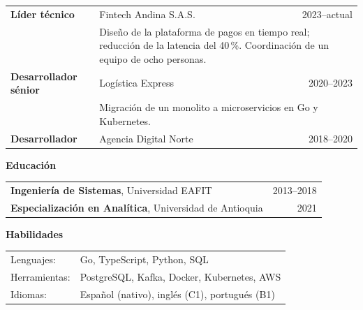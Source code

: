 \documentclass[10pt,letterpaper]{article}
\begin{document}
\begin{tabularx}{\textwidth}{@{}l X r@{}}
\textbf{Líder técnico} & Fintech Andina S.A.S. & 2023--actual\\
& \multicolumn{2}{p{0.75\textwidth}}{Diseño de la plataforma de pagos en tiempo real;
reducción de la latencia del 40\,\%. Coordinación de un equipo de ocho personas.}\\[6pt]
\textbf{Desarrollador sénior} & Logística Express & 2020--2023\\
& \multicolumn{2}{p{0.75\textwidth}}{Migración de un monolito a microservicios en Go y
Kubernetes.}\\[6pt]
\textbf{Desarrollador} & Agencia Digital Norte & 2018--2020\\
\end{tabularx}

\textbf{Educación}\par
\begin{tabularx}{\textwidth}{@{}X r@{}}
\textbf{Ingeniería de Sistemas}, Universidad EAFIT & 2013--2018\\
\textbf{Especialización en Analítica}, Universidad de Antioquia & 2021\\
\end{tabularx}

\textbf{Habilidades}\par
\begin{tabularx}{\textwidth}{@{}l X@{}}
Lenguajes: & Go, TypeScript, Python, SQL\\
Herramientas: & PostgreSQL, Kafka, Docker, Kubernetes, AWS\\
Idiomas: & Español (nativo), inglés (C1), portugués (B1)\\
\end{tabularx}
\end{document}
